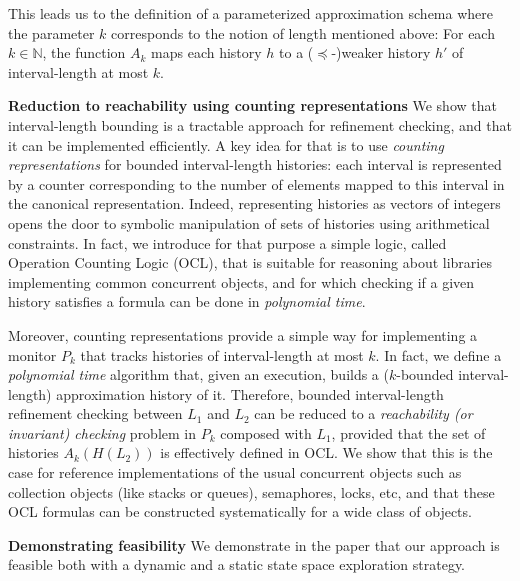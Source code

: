 This leads us to the definition of a parameterized approximation
schema where the parameter $k$ corresponds to the notion of length
mentioned above: For each $k \in \mathbb{N}$, the function $A_k$ maps each
history $h$ to a ($\preceq$-)weaker history $h'$ of interval-length at most $k$. 

\vspace{1mm}
{\bf Reduction to reachability using counting representations}
We show that interval-length bounding is a tractable approach for
refinement checking, and that it can be implemented efficiently. A key idea for
that is to use \emph{counting representations} for bounded interval-length
histories: each interval is represented by a counter corresponding to the
number of elements mapped to this interval in the canonical representation.
Indeed, representing histories as vectors of integers opens the door
to symbolic manipulation of sets of histories using arithmetical constraints.
In fact, we introduce for that purpose a simple logic, called 
Operation Counting Logic (OCL), that is suitable for reasoning about libraries
implementing common concurrent objects, and for which checking if a given
history satisfies a formula can be done in \emph{polynomial time}.

Moreover, counting representations provide a simple way for implementing a
monitor $P_k$ that tracks histories of interval-length at most $k$. In fact, we define
a \emph{polynomial time} algorithm that, given an execution, builds a
($k$-bounded interval-length) approximation history of it. Therefore, bounded
interval-length refinement checking between $L_1$ and $L_2$ can be reduced to a
\emph{reachability (or invariant) checking} problem in $P_k$ composed with
$L_1$, provided that the set of histories $A_k(H(L_2))$ is effectively defined
in OCL. We show that this is the case for reference implementations of the
usual concurrent objects such as collection objects (like stacks or queues),
semaphores, locks, etc, and that these OCL formulas can be constructed systematically
for a wide class of objects.

\vspace{1mm}
{\bf Demonstrating feasibility}
We demonstrate in the paper that our approach
is feasible both with a dynamic and a static state space exploration strategy.

